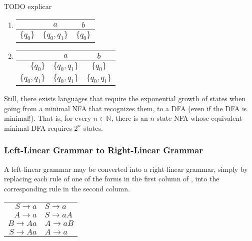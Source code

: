 \documentclass{article}
\theoremstyle{definition}
\begin{document}
TODO explicar
\begin{enumerate}
  \item
    \begin{tabular}{r|c|c}
       & $a$ & $b$  \\\hline
       $\{q_0\}$ & $\{q_0, q_1\}$ & $\{q_0\}$
    \end{tabular}
  \item 
    \begin{tabular}{r|c|c}
       & $a$ & $b$  \\
      \hline
       $\{q_0\}$ & $\{q_0, q_1\}$ & $\{q_0\}$ \\
       $\{q_0,q_1\}$ & $\{q_0, q_1\}$ & $\{q_0, q_1\}$
    \end{tabular}
\end{enumerate}



Still, there exists languages that require the exponential growth of states when
going from a minimal NFA that recognizes them, to a DFA (even if the DFA is
minimal!). That is, for every $n \in \mathbb{N}$, there is an $n$-state NFA
whose equivalent minimal DFA requires $2^n$ states.

\subsubsection*{Left-Linear Grammar to Right-Linear Grammar}
A left-linear grammar may be converted into a right-linear grammar, simply by
replacing each rule of one of the forms in the first column of , into the
corresponding rule in the second column.
\begin{tabular}{r|l}
  $S \to a$ & $S \to a$ \\
  $A \to a$ & $S \to aA$ \\
  $B \to Aa$ & $A \to aB$ \\
  $S \to Aa$ & $A \to a$
\end{tabular}
\end{document}
